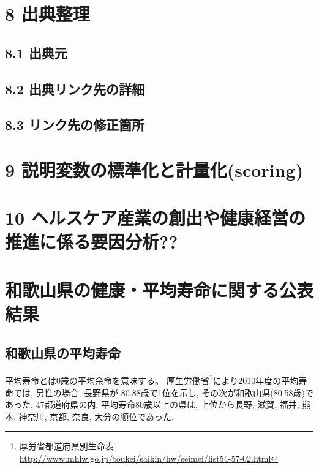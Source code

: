 \chapter{8 出典整理}

\section{8.1 出典元}


\section{8.2 出典リンク先の詳細}



\section{8.3 リンク先の修正箇所}





\chapter{9 説明変数の標準化と計量化(scoring)}


\chapter{10 ヘルスケア産業の創出や健康経営の推進に係る要因分析??}




\chapter{和歌山県の健康・平均寿命に関する公表結果}




\section{和歌山県の平均寿命}
平均寿命とは0歳の平均余命を意味する。
厚生労働省\footnote{
	厚労省都道府県別生命表
	\url{http://www.mhlw.go.jp/toukei/saikin/hw/seimei/list54-57-02.html}}により2010年度の平均寿命では,
男性の場合, 長野県が 80.88歳で1位を示し, その次が和歌山県(80.58歳)であった. 47都道府県の内, 平均寿命80歳以上の県は,
上位から長野, 滋賀,  福井, 熊本,  神奈川,   京都,   奈良,   大分の順位であった.

